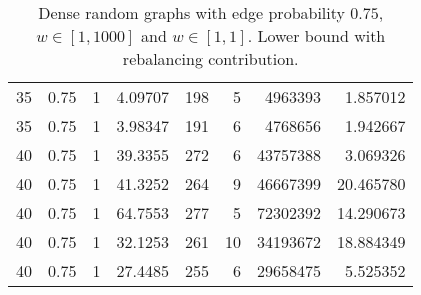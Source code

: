 \documentclass[a4paper,11pt]{article}
\begin{document}
\begin{table}
\begin{center}
\begin{tabular}{|rrr|r|r|rr|r|}
35 & 0.75 & 1 & 4.09707 & 198 & 5 & 4963393 & 1.857012 \\
35 & 0.75 & 1 & 3.98347 & 191 & 6 & 4768656 & 1.942667 \\
40 & 0.75 & 1 & 39.3355 & 272 & 6 & 43757388 & 3.069326 \\
40 & 0.75 & 1 & 41.3252 & 264 & 9 & 46667399 & 20.465780 \\
40 & 0.75 & 1 & 64.7553 & 277 & 5 & 72302392 & 14.290673 \\
40 & 0.75 & 1 & 32.1253 & 261 & 10 & 34193672 & 18.884349 \\
40 & 0.75 & 1 & 27.4485 & 255 & 6 & 29658475 & 5.525352 \\
\hline
\end{tabular}
\end{center}
\caption{Dense random graphs with edge probability $0.75$,
  $w\in[1,1000]$ and $w\in[1,1]$. Lower bound with rebalancing contribution.}
\label{tab:dense-rebal}
\end{table}
\end{document}
